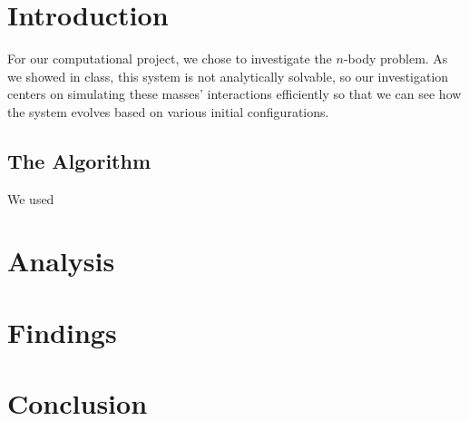 \documentclass[cm, 10pt]{article}
\begin{document}
  \section{Introduction}
    For our computational project, we chose to investigate the
    $n$-body problem. As we showed in class, this system is not
    analytically solvable, so our investigation centers on simulating
    these masses’ interactions efficiently so that we can see how the
    system evolves based on various initial configurations.

    \subsection{The Algorithm}
      We used



  \section{Analysis}


  \section{Findings}


  \section{Conclusion}

\end{document}
